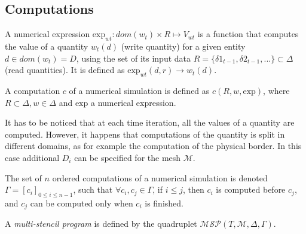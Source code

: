 \subsection{Computations}

\begin{mydef}
A numerical expression $\text{exp}_{wt}: dom(w_t)\times R\mapsto V_{wt}$ is a function that computes the value of a quantity $w_t(d)$ (write quantity) for a given entity $d \in dom(w_t)=D$, using the set of its input data $R=\{\delta 1_{t-1}, \delta 2_{t-1}, ...\} \subset \Delta$ (read quantities). It is defined as $\text{exp}_{wt}(d,r) \rightarrow w_t(d)$.
\end{mydef}

\begin{mydef}
A computation $c$ of a numerical simulation is defined as $c(R,w,\text{exp})$, where $R \subset \Delta, w \in \Delta$ and $\text{exp}$ a numerical expression. %
\end{mydef}
It has to be noticed that at each time iteration, all the values of a quantity are computed. However, it happens that computations of the quantity is split in different domains, as for example the computation of the physical border. In this case additional $D_i$ can be specified for the mesh $\mathcal{M}$.

\begin{mydef}
The set of $n$ ordered computations of a numerical simulation is denoted $\Gamma = [c_i]_{0 \leq i \leq n-1}$, such that $\forall c_i,c_j \in \Gamma$, if $i \leq j$, then $c_i$ is computed before $c_j$, and $c_j$ can be computed only when $c_i$ is finished.
\end{mydef}


\begin{mydef}
A \textit{multi-stencil program} is defined by the quadruplet $\mathcal{MSP}(T,\mathcal{M},\Delta,\Gamma)$.
\end{mydef}


